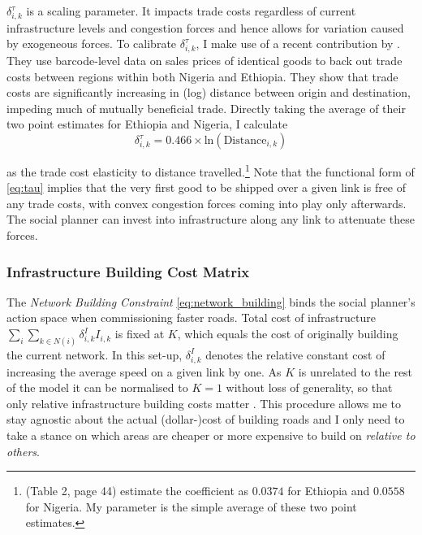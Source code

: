 \documentclass[11pt, oneside]{article}   	%
\begin{document}
$\delta^{\tau}_{i, k}$ is a scaling parameter. It impacts trade costs regardless of current infrastructure levels and congestion forces and hence allows for variation caused by exogeneous forces. To calibrate $\delta^{\tau}_{i, k}$, I make use of a recent contribution by \cite{atkin_whos_2015}. They use barcode-level data on sales prices of identical goods to back out trade costs between regions within both Nigeria and Ethiopia. They show that trade costs are significantly increasing in (log) distance between origin and destination, impeding much of mutually beneficial trade. Directly taking the average of their two point estimates for Ethiopia and Nigeria, I calculate
\begin{equation}
  \delta^{\tau}_{i,k} =  0.466\times\textrm{ln}(\textrm{Distance}_{i,k})
  \label{eq:delta_tau}
\end{equation}

as the trade cost elasticity to distance travelled.\footnote{\citeauthor{atkin_whos_2015} (Table 2, page 44) estimate the coefficient as $0.0374$ for Ethiopia and $0.0558$ for Nigeria. My parameter is the simple average of these two point estimates.} Note that the functional form of \eqref{eq:tau} implies that the very first good to be shipped over a given link is free of any trade costs, with convex congestion forces coming into play only  afterwards. The social planner can invest into infrastructure along any link to attenuate these forces.

\subsubsection{Infrastructure Building Cost Matrix }
The \emph{Network Building Constraint} \eqref{eq:network_building} binds the social planner's action space when commissioning faster roads. Total cost of infrastructure $\sum_{i}^{}\sum_{k \in N(i)}^{} \delta_{i,k}^{I}I_{i,k}$ is fixed at $K$, which equals the cost of originally building the current network. In this set-up, $\delta_{i,k}^{I}$ denotes the relative constant cost of increasing the average speed on a given link by one. As $K$ is unrelated to the rest of the model it can be normalised to $K=1$ without loss of generality, so that only relative infrastructure building costs matter \citep{fajgelbaum_optimal_2017}. This procedure allows me to stay agnostic about the actual (dollar-)cost of building roads and I only need to take a stance on which areas are cheaper or more expensive to build on \emph{relative to others}.
\end{document}
